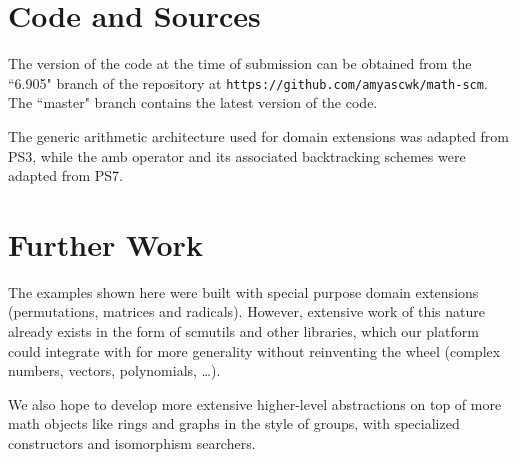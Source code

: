 \documentclass{article}
\begin{document}
    \section{Code and Sources}
        
        The version of the code at the time of submission can be obtained from the ``6.905" branch of the repository at \texttt{https://github.com/amyascwk/math-scm}. The ``master" branch contains the latest version of the code.

        
        The generic arithmetic architecture used for domain extensions was adapted from PS3, while the amb operator and its associated backtracking schemes were adapted from PS7.

	\section{Further Work}
	
	
	The examples shown here were built with special purpose domain extensions (permutations, matrices and radicals). However, extensive work of this nature already exists in the form of scmutils and other libraries, which our platform could integrate with for more generality without reinventing the wheel (complex numbers, vectors, polynomials, \ldots).
        
    We also hope to develop more extensive higher-level abstractions on top of more math objects like rings and graphs in the style of groups, with specialized constructors and isomorphism searchers.
    
\end{document}
